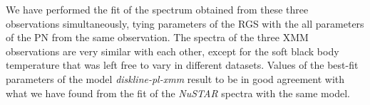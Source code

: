 \documentclass{aa}
\begin{document}
We have performed the fit of the spectrum obtained from these three observations 
simultaneously, tying parameters of the RGS with the all parameters of the PN from 
the same observation. The spectra of the three XMM observations are very similar 
with each other, except for the soft black body temperature that was left free to 
vary in different datasets. %
Values of the best-fit parameters of the model \emph{diskline-pl-xmm} result to be 
in good agreement with what we have found from the fit of the \emph{NuSTAR} spectra 
with the same model. 


\end{document}
